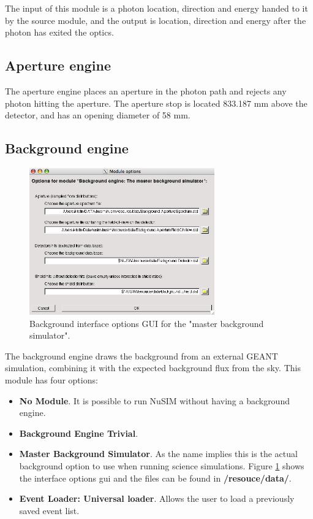 The input of this module is a photon location, direction and energy handed to it by the source module, and the output is location, direction and energy after the photon has exited the optics.


\subsection{Aperture engine}
The aperture engine places an aperture in the photon path and rejects any photon hitting the aperture. The aperture stop is located 833.187 mm above the detector, and has an opening diameter of 58 mm.

\subsection{Background engine}
\begin{figure}[tb]
\begin{center}
\includegraphics[width=8cm]{images/backgroundgui.png}  
\caption{Background interface options GUI for the "master background simulator".}
\label{bkggui} 
\end{center}
\end{figure}
The background engine draws the background from an external GEANT simulation, combining it with the expected background flux from the sky. This module has four options:
\begin{itemize}
\item \textbf{No Module}. It is possible to run NuSIM without having a background engine.
\item \textbf{Background Engine Trivial}. 
\item \textbf{Master Background Simulator}. As the name implies this is the actual background option to use when running science simulations. Figure \ref{bkggui} shows the interface options gui and the files can be found in\textbf{ /resouce/data/}.
\item \textbf{Event Loader: Universal loader}. Allows the user to load a previously saved event list.
\end{itemize}
